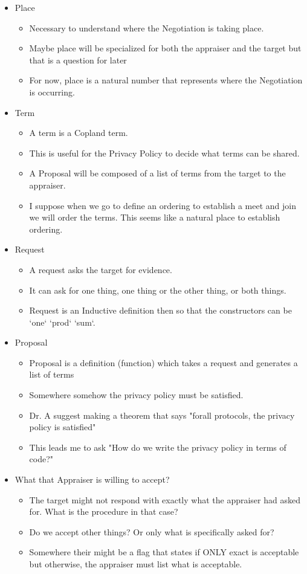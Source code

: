 \documentclass[10pt]{report}
\newcommand{\squash}{\itemsep=0pt\parskip=0pt}
\begin{document}
\begin{itemize}
\item Place
	\begin{itemize}
	\squash
	\item Necessary to understand where the Negotiation is taking place.
	\item Maybe place will be specialized for both the appraiser and
          the target but that is a question for later
	\item For now, place is a natural number that represents where the
          Negotiation is occurring.  
	\end{itemize}
\item Term
	\begin{itemize}
	\squash
	\item A term is a Copland term. 
	\item This is useful for the Privacy Policy to decide what terms can
          be shared. 
	\item A Proposal will be composed of a list of terms from the target
          to the appraiser.
	\item I suppose when we go to define an ordering to establish a meet
          and join we will order the terms. This seems like a natural place
          to establish ordering. 
	\end{itemize}
\item Request
	\begin{itemize}
	\item A request asks the target for evidence. 
	\item It can ask for one thing, one thing or the other thing, or
          both things. 
	\item Request is an Inductive definition then so that the constructors
          can be `one` `prod` `sum`.
	\end{itemize}
\item Proposal
	\begin{itemize}
	\item Proposal is a definition (function) which takes a request
          and generates a list of terms
	\item Somewhere somehow the privacy policy must be satisfied. 
	\item Dr. A suggest making a theorem that says "forall protocols,
          the privacy policy is satisfied"
	\item This leads me to ask "How do we write the privacy policy in
          terms of code?"
	\end{itemize}
\item What that Appraiser is willing to accept?
	\begin{itemize}
	\item The target might not respond with exactly what the appraiser
          had asked for. What is the procedure in that case?
	\item Do we accept other things? Or only what is specifically asked for?
	\item Somewhere their might be a flag that states if ONLY exact is
          acceptable but otherwise, the appraiser must list what is acceptable. 
	\end{itemize}


\end{itemize}
\end{document}
